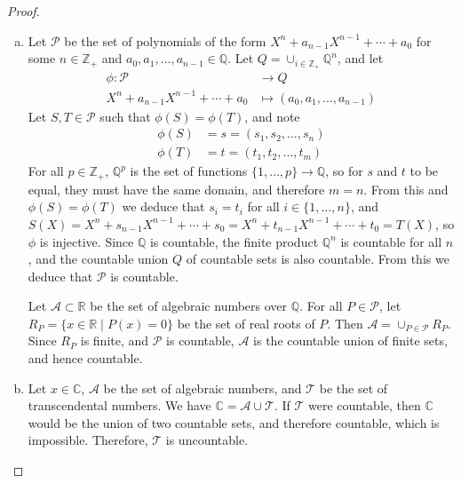 \documentclass[11pt,a4paper,twoside]{article}
\theoremstyle{definition}
\begin{document}
\begin{proof}\hfill

  \begin{enumerate}[(a)]

  \item Let $\mathscr{P}$ be the set of polynomials of the form $X^n + a_{n - 1} X^{n - 1} + \dotsb + a_0$ for some $n \in \mathbb{Z}_+$
    and $a_0, a_1, \dotsc, a_{n - 1} \in \mathbb{Q}$. Let $Q = \cup_{i \in \mathbb{Z}_+} \mathbb{Q}^n$, and let
    \begin{align*}
      \phi : \mathscr{P} &\to Q \\
      X^n + a_{n - 1} X^{n - 1} + \dotsb + a_0 &\mapsto (a_0, a_1, \dotsc, a_{n - 1})
    \end{align*}
    Let $S, T \in \mathscr{P}$ such that $\phi (S) = \phi (T)$, and note
    \begin{align*}
        \phi (S) &= s = (s_1, s_2, \dotsc, s_n) \\
        \phi (T) &= t = (t_1, t_2, \dotsc, t_m)
    \end{align*}
    For all $p \in \mathbb{Z}_+$, $\mathbb{Q}^p$ is the set of functions $\{ 1, \dotsc, p \} \to \mathbb{Q}$, so for $s$ and $t$ to be equal,
    they must have the same domain, and therefore $m = n$. From this and $\phi (S) = \phi (T)$ we deduce that $s_i = t_i$ for all $i \in \{ 1, \dotsc, n \}$,
    and $S (X) = X^n + s_{n - 1} X^{n - 1} + \dotsb + s_0 = X^n + t_{n - 1} X^{n - 1} + \dotsb + t_0 = T (X)$, so $\phi$ is injective.
    Since $\mathbb{Q}$ is countable, the finite product $\mathbb{Q}^n$ is countable for all $n$, and the countable union $Q$ of countable sets is also countable.
    From this we deduce that $\mathscr{P}$ is countable.

    Let $\mathscr{A} \subset \mathbb{R}$ be the set of algebraic numbers over $\mathbb{Q}$. For all $P \in \mathscr{P}$,
    let $R_P = \{ x \in \mathbb{R} \mid P (x) = 0 \}$ be the set of real roots of $P$. Then $\mathscr{A} = \cup_{P \in \mathscr{P}} R_P$.
    Since $R_P$ is finite, and $\mathscr{P}$ is countable, $\mathscr{A}$ is the countable union of finite sets, and hence countable.

  \item Let $x \in \mathbb{C}$, $\mathscr{A}$ be the set of algebraic numbers, and $\mathscr{T}$ be the set of transcendental numbers.
    We have $\mathbb{C} = \mathscr{A} \cup \mathscr{T}$. If $\mathscr{T}$ were countable, then $\mathbb{C}$ would be the union of two countable sets,
    and therefore countable, which is impossible. Therefore, $\mathscr{T}$ is uncountable.

  \end{enumerate}

\end{proof}
\end{document}
